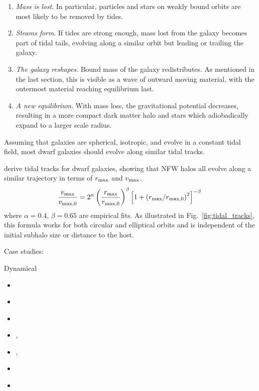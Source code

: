 \begin{enumerate}
\def\labelenumi{\arabic{enumi}.}
\tightlist
\item
  \emph{Mass is lost}. In particular, particles and stars on weakly
  bound orbits are most likely to be removed by tides.
\item
  \emph{Steams form}. If tides are strong enough, mass lost from the
  galaxy becomes part of tidal tails, evolving along a similar orbit but
  leading or trailing the galaxy.
\item
  \emph{The galaxy reshapes}. Bound mass of the galaxy redistributes. As
  mentioned in the last section, this is visible as a wave of outward
  moving material, with the outermost material reaching equilibrium
  last.
\item
  \emph{A new equilibrium}. With mass loss, the gravitational potential
  decreases, resulting in a more compact dark matter halo and stars
  which adiobadically expand to a larger scale radius.
\end{enumerate}

Assuming that galaxies are spherical, isotropic, and evolve in a
constant tidal field, most dwarf galaxies should evolve along similar
tidal tracks.

\citet{EN2021} derive tidal tracks for dwarf galaxies, showing that NFW
halos all evolve along a similar trajectory in terms of \(r_{\rm max}\)
and \(v_{\rm max}\). \begin{equation}{
\frac{v_{\rm max}}{v_{\rm max, 0}} = 
2^\alpha 
\left(\frac{r_{\rm max}}{r_{\rm max, 0}}\right)^{\beta}\left[1 + \left(r_{\rm max} / r_{\rm max, 0}\right)^2\right]^{-\beta}
}\end{equation} where \(\alpha=0.4\), \(\beta=0.65\) are empirical fits.
As illustrated in Fig.~\ref{fig:tidal_tracks}, this formula works for
both circular and elliptical orbits and is independent of the initial
subhalo size or distance to the host.

Case studies:

Dynamical

\begin{itemize}
\tightlist
\item
  \citet{read+2006}
\item
  \citet{bullock+johnston2005}
\item
  \citet{PNM2008}
\item
  \citet{errani+2023a}, \citet{fattahi+2018}
\item
  \citet{wang+2017},
\item
  \citet{pryor1996}
\item
  \citet{klimentowski+2009}
\end{itemize}

